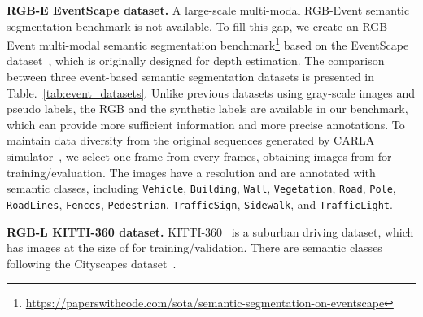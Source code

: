 \documentclass[journal]{IEEEtran}
\begin{document}
\noindent\textbf{RGB-E EventScape dataset.}
A large-scale multi-modal RGB-Event semantic segmentation benchmark is not available. To fill this gap, we create an RGB-Event multi-modal semantic segmentation benchmark\footnote[1]{\url{https://paperswithcode.com/sota/semantic-segmentation-on-eventscape}} based on the EventScape dataset~\cite{gehrig2021eventscape_dataset}, which is originally designed for depth estimation. The comparison between three event-based semantic segmentation datasets is presented in Table.~\ref{tab:event_datasets}. Unlike previous datasets using gray-scale images and pseudo labels, the RGB and the synthetic labels are available in our benchmark, which can provide more sufficient information and more precise annotations. To maintain data diversity from the original sequences generated by CARLA simulator~\cite{dosovitskiy2017carla}, we select one frame from every  frames, obtaining  images from  for training/evaluation. The images have a  resolution and are annotated with  semantic classes, including \texttt{Vehicle}, \texttt{Building}, \texttt{Wall}, \texttt{Vegetation}, \texttt{Road}, \texttt{Pole}, \texttt{RoadLines}, \texttt{Fences}, \texttt{Pedestrian}, \texttt{TrafficSign}, \texttt{Sidewalk}, and \texttt{TrafficLight}.

\begin{table}[!t]
\centering
\caption{\textsc{Comparison of event-based semantic segmentation datasets.} 
}
\label{tab:event_datasets}
\end{table} 
\noindent\textbf{RGB-L KITTI-360 dataset.}
KITTI-360~\cite{liao2021kitti360} is a suburban driving dataset, which has  images at the size of  for training/validation. There are  semantic classes following the Cityscapes dataset~\cite{cordts2016cityscapes}.
\end{document}
